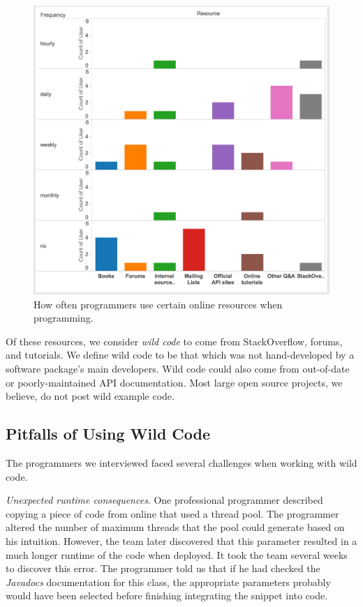 \begin{figure}
 \centering
 \includegraphics[width=.9\columnwidth]{figures/resource_frequencies}
 \caption{How often programmers use certain online resources when programming.}
 \label{fig:resource_frequencies}
\end{figure}

Of these resources, we consider \emph{wild code} to come from StackOverflow, forums, and tutorials.
We define wild code to be that which was not hand-developed by a software package's main developers.
Wild code could also come from out-of-date or poorly-maintained API documentation.
Most large open source projects, we believe, do not post wild example code.

\subsection{Pitfalls of Using Wild Code}

The programmers we interviewed faced several challenges when working with wild code.

\emph{Unexpected runtime consequences}.
One professional programmer described copying a piece of code from online that used a thread pool.
The programmer altered the number of maximum threads that the pool could generate based on his intuition.
However, the team later discovered that this parameter resulted in a much longer runtime of the code when deployed.
It took the team several weeks to discover this error.
The programmer told us that if he had checked the \emph{Javadocs} documentation for this class, the appropriate parameters probably would have been selected before finishing integrating the snippet into code.

